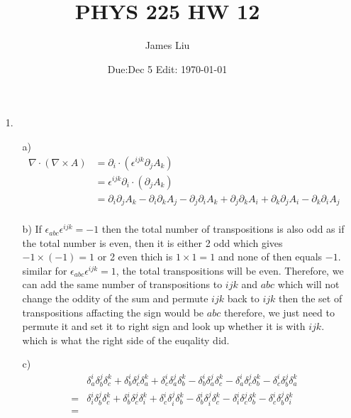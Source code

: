 \documentclass{article}
\date{Due:Dec 5 Edit: \today}
\title{PHYS 225 HW 12}
\author{James Liu}
\begin{document}
\maketitle
\begin{itemize}
    \item [1.] 
    \begin{itemize}
        \item [a)]
        \begin{align*}
            \nabla\cdot \left(\nabla\times A\right)&= \partial_i\cdot(\epsilon^{ijk}\partial_j A_k)\\
            &= \epsilon^{ijk}\partial_i\cdot(\partial_j A_k)\\
            &=\partial_i\partial_jA_k-\partial_i\partial_kA_j-\partial_j\partial_iA_k+\partial_j\partial_kA_i+\partial_k\partial_jA_i-\partial_k\partial_iA_j\\
        \end{align*}
        \item [b)] If \(\epsilon_{abc}\epsilon^{ijk}=-1\) then the total number of transpositions is also odd as if the total number is even, then it is either 2 odd which gives \(-1\times (-1)=1\)  or 2 even thich is \(1\times 1=1\) and none of then equals \(-1\).
        similar for \(\epsilon_{abc}\epsilon^{ijk}=1\), the total transpositions will be even. Therefore, we can add the same number of transpositions to \(ijk\) and \(abc\) which will not change the oddity of the sum and permute \(ijk\) back to \(ijk\) then the set of transpositions 
        affacting the sign would be \(abc\) therefore, we just need to permute it and set it to right sign and look up whether it is with \(ijk\). which is what the right side of the
        euqality did.
        \item [c)] 
        \begin{align*}
            &\delta^{i}_{a}\delta^{j}_{b}\delta^{k}_{c}+\delta^{i}_{b}\delta^{j}_{c}\delta^{k}_{a}+\delta^{i}_{c}\delta^{j}_{a}\delta^{k}_{b}-\delta^{i}_{b}\delta^{j}_{a}\delta^{k}_{c}-\delta^{i}_{a}\delta^{j}_{c}\delta^{k}_{b}-\delta^{i}_{c}\delta^{j}_{b}\delta^{k}_{a}\\
            =&\delta^{i}_{i}\delta^{j}_{b}\delta^{k}_{c}+\delta^{i}_{b}\delta^{j}_{c}\delta^{k}_{i}+\delta^{i}_{c}\delta^{j}_{i}\delta^{k}_{b}-\delta^{i}_{b}\delta^{j}_{i}\delta^{k}_{c}-\delta^{i}_{i}\delta^{j}_{c}\delta^{k}_{b}-\delta^{i}_{c}\delta^{j}_{b}\delta^{k}_{i}\\
            =& \\
        \end{align*}

\end{itemize}
\end{itemize}
\end{document}
